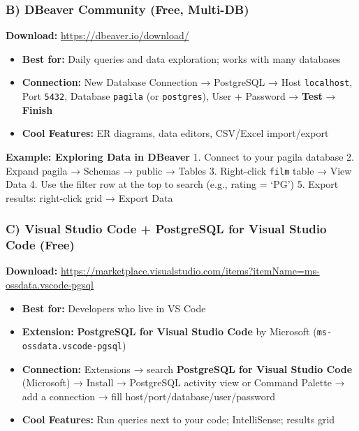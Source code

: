 \documentclass[
  letterpaper,
  DIV=11,
  numbers=noendperiod]{scrartcl}
\providecommand{\tightlist}{%
  \setlength{\itemsep}{0pt}\setlength{\parskip}{0pt}}\usepackage{longtable,booktabs,array}
\begin{document}
\subsubsection{B) DBeaver Community (Free,
Multi-DB)}\label{b-dbeaver-community-free-multi-db}

\textbf{Download:} \url{https://dbeaver.io/download/}

\begin{itemize}
\tightlist
\item
  \textbf{Best for:} Daily queries and data exploration; works with many
  databases
\item
  \textbf{Connection:} New Database Connection → PostgreSQL → Host
  \texttt{localhost}, Port \texttt{5432}, Database \texttt{pagila} (or
  \texttt{postgres}), User + Password → \textbf{Test} → \textbf{Finish}
\item
  \textbf{Cool Features:} ER diagrams, data editors, CSV/Excel
  import/export
\end{itemize}

\textbf{Example: Exploring Data in DBeaver} 1. Connect to your pagila
database 2. Expand pagila → Schemas → public → Tables 3. Right-click
\texttt{film} table → View Data 4. Use the filter row at the top to
search (e.g., rating = `PG') 5. Export results: right-click grid →
Export Data

\subsubsection{C) Visual Studio Code + PostgreSQL for Visual Studio Code
(Free)}\label{c-visual-studio-code-postgresql-extension-free}

\textbf{Download:}
\url{https://marketplace.visualstudio.com/items?itemName=ms-ossdata.vscode-pgsql}

\begin{itemize}
\tightlist
\item
  \textbf{Best for:} Developers who live in VS Code
\item
  \textbf{Extension:} \textbf{PostgreSQL for Visual Studio Code} by
  Microsoft (\texttt{ms-ossdata.vscode-pgsql})
\item
  \textbf{Connection:} Extensions → search \textbf{PostgreSQL for
  Visual Studio Code} (Microsoft) → Install → PostgreSQL activity view
  or Command Palette → add a connection → fill
  host/port/database/user/password
\item
  \textbf{Cool Features:} Run queries next to your code; IntelliSense;
  results grid
\end{itemize}
\end{document}
